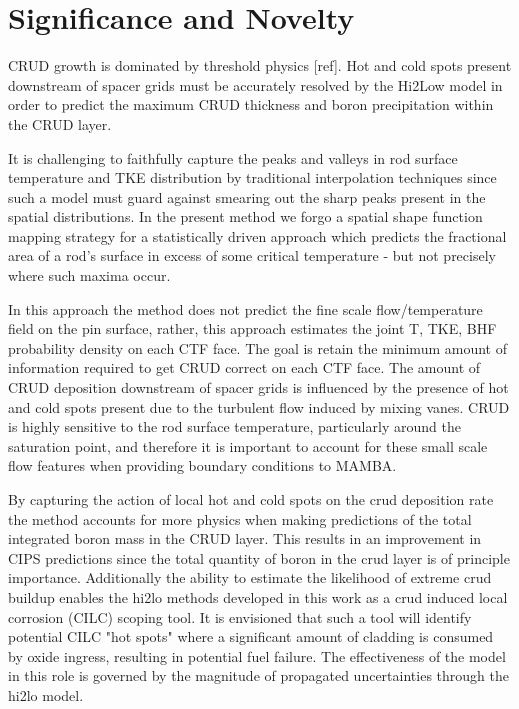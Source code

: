 \section{Significance and Novelty}

CRUD growth is dominated by threshold physics [ref].  Hot and cold spots
present downstream of spacer grids must be accurately resolved by the Hi2Low model
in order to predict the maximum CRUD
thickness and boron precipitation within the CRUD layer.  

It is challenging to faithfully capture the peaks and valleys in
rod surface temperature and TKE distribution by traditional interpolation
techniques since such a model must guard against smearing out the sharp peaks
present in the spatial distributions.  
In the present method we forgo a spatial shape function mapping strategy
for a statistically driven approach which predicts the fractional
area of a rod's surface in excess of some critical temperature - but not
precisely where such maxima occur.

In this approach the method does not predict the fine scale flow/temperature field on the pin surface, rather, this approach estimates the joint T, TKE, BHF probability density on each CTF face.  The goal is retain the minimum amount of information required to get CRUD correct on each CTF face.  The amount of CRUD deposition downstream of spacer grids is influenced by the presence of hot and cold spots present due to the turbulent flow induced by mixing vanes.  CRUD is highly sensitive to the rod surface temperature, particularly around the saturation point, and therefore it is important to account for these small scale flow features when providing boundary conditions to MAMBA.

By capturing the action of local hot and cold spots on the crud deposition rate the method accounts for more physics when making predictions of the total integrated boron mass in the CRUD layer.  This results in an improvement in CIPS predictions since the total quantity of boron in the crud layer is of principle importance.  Additionally the ability to estimate the likelihood of extreme crud buildup enables the hi2lo methods developed in this work as a crud induced local corrosion (CILC) scoping tool.  It is envisioned that such a tool will identify potential CILC "hot spots" where a significant amount of cladding is consumed by oxide ingress, resulting in potential fuel failure.  The effectiveness of the model in this role is governed by the magnitude of propagated uncertainties through the hi2lo model.


